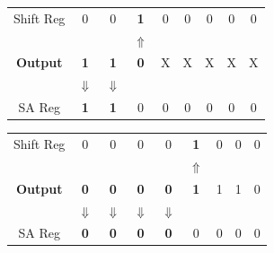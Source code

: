 \documentclass[conference]{IEEEtran}
\begin{document}

\begin{table}[h]		
	\begin{center}	
		\begin{tabular}{ c  c  c  c  c  c  c  c  c }
			Shift Reg  & 0 & 0 & \textbf{1} & 0 & 0 & 0 & 0 & 0 \\
				   &  &  & $\Uparrow$ & & & & & \\		
	 		\textbf{Output}   & \textbf{1} & \textbf{1} & \textbf{0} & X & X & X & X & X \\
				   & $\Downarrow$ & $\Downarrow$ & & & & & & \\
			SA Reg     & \textbf{1} & \textbf{1} & 0 & 0 & 0 & 0 & 0 & 0 \\			
		\end{tabular}
	\end{center}
\end{table}



\begin{table}[h]
\begin{center}	
		\begin{tabular}{ c  c  c  c  c  c  c  c  c }
			Shift Reg  & 0 & 0 & 0 & 0 & \textbf{1} & 0 & 0 & 0 \\
				   & &  &  &  &$\Uparrow$ & & & \\	
	 		 \textbf{Output}   & \textbf{0} & \textbf{0} & \textbf{0} & \textbf{0} & \textbf{1} & 1 & 1 & 0 \\
				   & $\Downarrow$ & $\Downarrow$ &  $\Downarrow$ &  $\Downarrow$ & & & & \\
			SA Reg     & \textbf{0} & \textbf{0} & \textbf{0} & \textbf{0} & 0 & 0 & 0 & 0 \\
			
		\end{tabular}
	\end{center}
\end{table}
\end{document}
